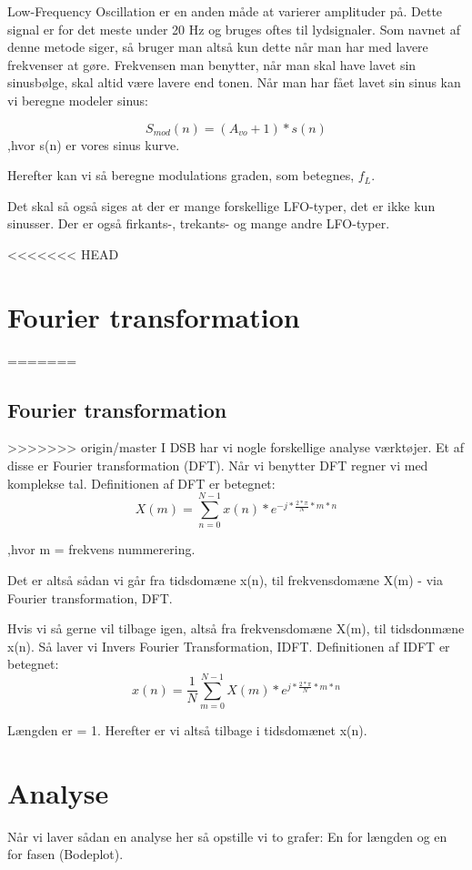 \documentclass[12pt, letterpaper]{article}
\begin{document}
Low-Frequency Oscillation er en anden måde at varierer amplituder på. 
Dette signal er for det meste under 20 Hz og bruges oftes til lydsignaler. Som navnet af denne metode siger, så bruger man altså kun dette når man har med lavere frekvenser at gøre. Frekvensen man benytter, når man skal have lavet sin sinusbølge, skal altid være lavere end tonen. 
Når man har fået lavet sin sinus kan vi beregne modeler sinus: 

$$S_{mod} (n) = (A_{vo} + 1)*s(n)$$
,hvor s(n) er vores sinus kurve. 

Herefter kan vi så beregne modulations graden, som betegnes, $f_L$.

Det skal så også siges at der er mange forskellige LFO-typer, det er ikke kun sinusser. Der er også firkants-, trekants-  og mange andre LFO-typer. 

<<<<<<< HEAD
\section{Fourier transformation}
=======
\subsection{Fourier transformation}
>>>>>>> origin/master
I DSB har vi nogle forskellige analyse værktøjer. Et af disse er Fourier transformation (DFT). Når vi benytter DFT regner vi med komplekse tal. 
Definitionen af DFT er betegnet: 
$$X(m)= \sum\limits_{n=0}^{N-1} x(n)*e^{-j*\frac{2*\pi}{N}*m*n}$$

,hvor m = frekvens nummerering. 



Det er altså sådan vi går fra tidsdomæne x(n), til frekvensdomæne X(m) - via Fourier transformation, DFT. 

Hvis vi så gerne vil tilbage igen, altså fra frekvensdomæne X(m), til tidsdonmæne x(n). Så laver vi Invers Fourier Transformation, IDFT. 
Definitionen af IDFT er betegnet: 
$$x(n)= \frac{1}{N} \sum\limits_{m=0}^{N-1} X(m)*e^{j*\frac{2*\pi}{N}*m*n}$$

Længden er = 1. 
Herefter er vi altså tilbage i tidsdomænet x(n).

\section{Analyse}

Når vi laver sådan en analyse her så opstille vi to grafer: 
En for længden og en for fasen (Bodeplot). \\
\end{document}
